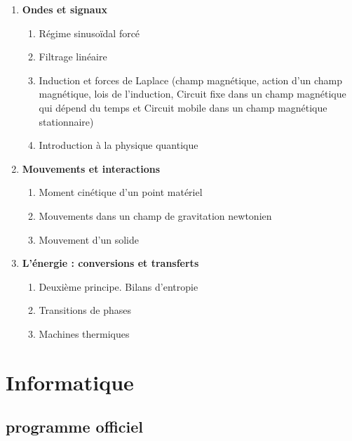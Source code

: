 \documentclass{beamer}
\begin{document}
\begin{frame}
    \begin{enumerate}[label=\textbf{\arabic*.},leftmargin=*]
        \item \textbf{Ondes et signaux}
        \begin{enumerate}[label=1.\arabic*.]
            \item Régime sinusoïdal forcé
            \item Filtrage linéaire
            \item  Induction et forces de Laplace (champ magnétique, action d'un champ magnétique, lois de l'induction, Circuit fixe dans un champ magnétique qui dépend du temps et Circuit mobile dans un champ magnétique stationnaire)
            \item Introduction à la physique quantique
        \end{enumerate}
        \item \textbf{Mouvements et interactions}
        \begin{enumerate}[label=2.\arabic*.]
            \item Moment cinétique d’un point matériel
            \item Mouvements dans un champ de gravitation newtonien
            \item Mouvement d’un solide
        \end{enumerate}
        \item \textbf{L’énergie : conversions et transferts}
        \begin{enumerate}[label=3.\arabic*.]
            \item Deuxième principe. Bilans d'entropie
            \item Transitions de phases
            \item Machines thermiques 
        \end{enumerate}    
    \end{enumerate}
\end{frame}

\section{Informatique}

\subsection{programme officiel}
\end{document}
